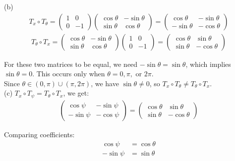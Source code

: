 \documentclass{article}
\begin{document}
(b)
\begin{align*}
T_x \circ T_{\theta} = 
\begin{pmatrix} 
1 & 0 \\ 
0 & -1 
\end{pmatrix}
\begin{pmatrix} 
\cos\theta & -\sin\theta \\ 
\sin\theta & \cos\theta 
\end{pmatrix} = 
\begin{pmatrix} 
\cos\theta & -\sin\theta \\ 
-\sin\theta & -\cos\theta 
\end{pmatrix}
\end{align*}
\begin{align*}
T_{\theta} \circ T_x = 
\begin{pmatrix} 
\cos\theta & -\sin\theta \\ 
\sin\theta & \cos\theta 
\end{pmatrix}
\begin{pmatrix} 
1 & 0 \\ 
0 & -1 
\end{pmatrix} = 
\begin{pmatrix} 
\cos\theta & \sin\theta \\ 
\sin\theta & -\cos\theta 
\end{pmatrix}
\end{align*}

For these two matrices to be equal, we need $-\sin\theta = \sin\theta$, which implies $\sin\theta = 0$. This occurs only when $\theta = 0, \pi, \text{ or } 2\pi$. \\

Since $\theta \in (0,\pi) \cup (\pi,2\pi)$, we have $\sin\theta \neq 0$, so $T_x \circ T_{\theta} \neq T_{\theta} \circ T_x$. \\

(c) $T_x \circ T_{\psi} = T_{\theta} \circ T_x$, we get:
\begin{align*}
\begin{pmatrix} 
\cos\psi & -\sin\psi \\ 
-\sin\psi & -\cos\psi 
\end{pmatrix} = 
\begin{pmatrix} 
\cos\theta & \sin\theta \\ 
\sin\theta & -\cos\theta 
\end{pmatrix}
\end{align*}

Comparing coefficients:
\begin{align*}
\cos\psi &= \cos\theta\\
-\sin\psi &= \sin\theta\\
\end{align*}
\end{document}

